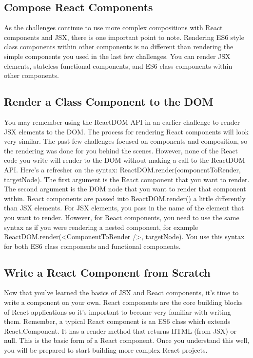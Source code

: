 \documentclass{article}%
\begin{document}
%
\subsection{Compose React Components}%
\label{subsec:ComposeReactComponents}%
As the challenges continue to use more complex compositions with React components and JSX, there is one important point to note. Rendering ES6 style class components within other components is no different than rendering the simple components you used in the last few challenges. You can render JSX elements, stateless functional components, and ES6 class components within other components.\newline%

%
\subsection{Render a Class Component to the DOM}%
\label{subsec:RenderaClassComponenttotheDOM}%
You may remember using the ReactDOM API in an earlier challenge to render JSX elements to the DOM. The process for rendering React components will look very similar. The past few challenges focused on components and composition, so the rendering was done for you behind the scenes. However, none of the React code you write will render to the DOM without making a call to the ReactDOM API.\newline%
Here's a refresher on the syntax: ReactDOM.render(componentToRender, targetNode). The first argument is the React component that you want to render. The second argument is the DOM node that you want to render that component within.\newline%
React components are passed into ReactDOM.render() a little differently than JSX elements. For JSX elements, you pass in the name of the element that you want to render. However, for React components, you need to use the same syntax as if you were rendering a nested component, for example ReactDOM.render(<ComponentToRender />, targetNode). You use this syntax for both ES6 class components and functional components.\newline%

%
\subsection{Write a React Component from Scratch}%
\label{subsec:WriteaReactComponentfromScratch}%
Now that you've learned the basics of JSX and React components, it's time to write a component on your own. React components are the core building blocks of React applications so it's important to become very familiar with writing them. Remember, a typical React component is an ES6 class which extends React.Component. It has a render method that returns HTML (from JSX) or null. This is the basic form of a React component. Once you understand this well, you will be prepared to start building more complex React projects.\newline%
\end{document}
